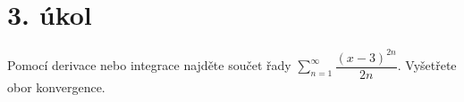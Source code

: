 \section{3. úkol}
Pomocí derivace nebo integrace najděte součet řady $\sum\limits_{n=1}^\infty \dfrac{(x-3)^{2n}}{2n}$. Vyšetřete obor konvergence.
